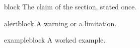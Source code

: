 \documentclass[a4paper, 11pt]{article}
\begin{document}
\begin{block}{block}
  The claim of the section, stated once.
\end{block}
\begin{alertblock}{alertblock}
  A warning or a limitation.
\end{alertblock}
\begin{exampleblock}{exampleblock}
  A worked example.
\end{exampleblock}
\end{document}
